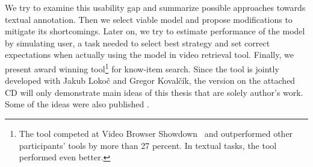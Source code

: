 We try to examine this usability gap and summarize possible approaches towards textual annotation. Then we select viable model and propose modifications to mitigate its shortcomings. Later on, we try to estimate performance of the model by simulating user, a task needed to select best strategy and set correct expectations when actually using the model in video retrieval tool. Finally, we present award winning tool\footnote{The tool competed at Video Browser Showdown~\cite{cobarzan2017interactive} and outperformed other participants' tools by more than 27 percent. In textual tasks, the tool performed even better.} for know-item search. Since the tool is jointly developed with Jakub Lokoč and Gregor Kovalčík, the version on the attached CD will only demonstrate main ideas of this thesis that are solely author's work. Some of the ideas were also published \cite{lokovc2018revisiting}.

